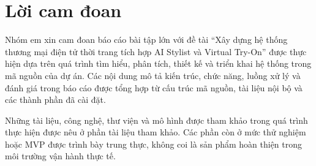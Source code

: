 \chapter*{Lời cam đoan}
{}

Nhóm em xin cam đoan báo cáo bài tập lớn với đề tài ``Xây dựng hệ thống thương mại điện tử thời trang tích hợp AI Stylist và Virtual Try-On'' được thực hiện dựa trên quá trình tìm hiểu, phân tích, thiết kế và triển khai hệ thống trong mã nguồn của dự án. Các nội dung mô tả kiến trúc, chức năng, luồng xử lý và đánh giá trong báo cáo được tổng hợp từ cấu trúc mã nguồn, tài liệu nội bộ và các thành phần đã cài đặt.

\medskip

Những tài liệu, công nghệ, thư viện và mô hình được tham khảo trong quá trình thực hiện được nêu ở phần tài liệu tham khảo. Các phần còn ở mức thử nghiệm hoặc MVP được trình bày trung thực, không coi là sản phẩm hoàn thiện trong môi trường vận hành thực tế.

\vspace{1cm}
\clearpage

